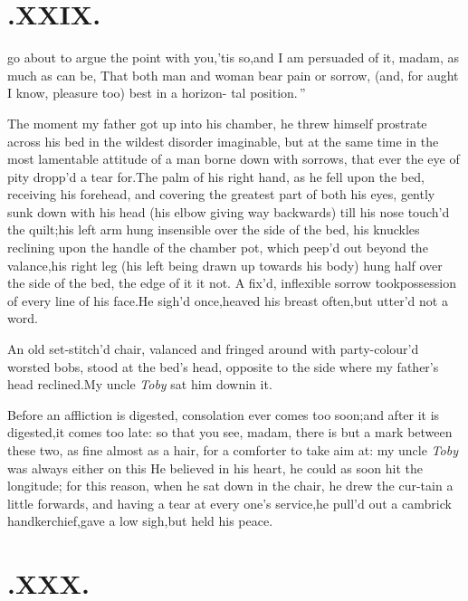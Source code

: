 \documentclass{article}
\begin{document}
\section{.\quad  XXIX.}

 go about to argue the\break
point with you,\tsk ’tis so,\tsk and
I am persuaded of it, madam, as much\break
as can be, \lqq That both man and woman\break
\lqq bear pain or sorrow, (and, for aught I\break
\lqq know, pleasure too) best in a horizon-\break
\lqq tal position.\,”

The moment my father got up into his chamber, he threw himself prostrate across his
bed in the wildest disorder im\-aginable, but at the same time in the
most lamentable attitude of a man borne down with sorrows, that
ever the eye of pity dropp’d a tear for.\tsh The
palm of his right hand, as he fell upon the bed, receiving his
forehead, and covering the greatest part of both his eyes, gently
sunk down with his head (his elbow giving way backwards) till his
nose touch’d the quilt;\tsh his left arm hung
insensible over the side of the bed, his knuckles reclining upon
the handle of the chamber
pot, which peep’d out beyond the va\-lance,\tsh his right leg (his
left being drawn up towards his body) hung half over the side of
the bed, the edge of it 
it not. A fix’d, inflexible sorrow took\break possession of every line
of his face.\tsk He sigh’d once,\tsh heaved his breast
often,\tsk\break but utter’d not a word.

An old set-stitch’d chair, valanced and fringed around
with party-colour’d wor\-sted bobs, stood at the bed’s
head, opposite to the side where my father’s head
reclined.\tsk My uncle \textit{Toby} sat him down\break in it.

Before an affliction is digested,\tsh\break
consolation ever comes too soon;\tsk and 
after it is digested,\tsk it comes too late:
so that you see, madam, there is but a
mark between these two, as fine almost as a hair, for a
comforter to take aim at: my uncle \textit{Toby} was always
either on this
\break
He believed in his heart, he could as soon hit the longitude;
for this reason, when he sat down in the chair, he drew the
cur-tain a little forwards, and having a tear at every one’s
service,\tsk he pull’d out a cambrick handkerchief,\tsh gave a
low sigh,\tsh but held his peace.

\null
\section{.\quad  XXX.}
\end{document}
